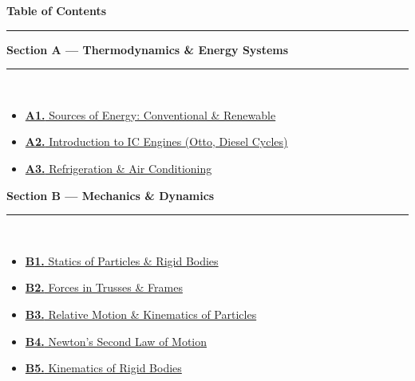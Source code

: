 \documentclass[12pt,a3paper]{article}
\begin{document}
\thispagestyle{fancy}
\begin{center}
  {\LARGE\bfseries\textcolor{pblue}{Table of Contents}}\\[6pt]
  \textcolor{pblue}{\rule{0.6\textwidth}{0.8pt}}
\end{center}
\vspace{6pt}

\begin{tcolorbox}[colback=cA!5,colframe=cA,boxrule=1pt,arc=5pt,
  left=8pt,right=8pt,top=8pt,bottom=8pt,before skip=4pt]
  {\large\bfseries\textcolor{cA}{Section A --- Thermodynamics \& Energy Systems}}\\[5pt]
  \textcolor{cA!40}{\rule{\textwidth}{0.4pt}}\\[3pt]
  \small\begin{itemize}[leftmargin=1.2em,itemsep=1pt,label={\textcolor{cA}{$\triangleright$}}]
    \item \hyperref[sec:A1]{\textbf{A1.} Sources of Energy: Conventional \& Renewable}
    \item \hyperref[sec:A2]{\textbf{A2.} Introduction to IC Engines (Otto, Diesel Cycles)}
    \item \hyperref[sec:A3]{\textbf{A3.} Refrigeration \& Air Conditioning}
  \end{itemize}
\end{tcolorbox}

\begin{tcolorbox}[colback=cB!5,colframe=cB,boxrule=1pt,arc=5pt,
  left=8pt,right=8pt,top=8pt,bottom=8pt,before skip=4pt]
  {\large\bfseries\textcolor{cB}{Section B --- Mechanics \& Dynamics}}\\[5pt]
  \textcolor{cB!40}{\rule{\textwidth}{0.4pt}}\\[3pt]
  \small\begin{itemize}[leftmargin=1.2em,itemsep=1pt,label={\textcolor{cB}{$\triangleright$}}]
    \item \hyperref[sec:B1]{\textbf{B1.} Statics of Particles \& Rigid Bodies}
    \item \hyperref[sec:B2]{\textbf{B2.} Forces in Trusses \& Frames}
    \item \hyperref[sec:B3]{\textbf{B3.} Relative Motion \& Kinematics of Particles}
    \item \hyperref[sec:B4]{\textbf{B4.} Newton's Second Law of Motion}
    \item \hyperref[sec:B5]{\textbf{B5.} Kinematics of Rigid Bodies}
  \end{itemize}
\end{tcolorbox}
\end{document}
